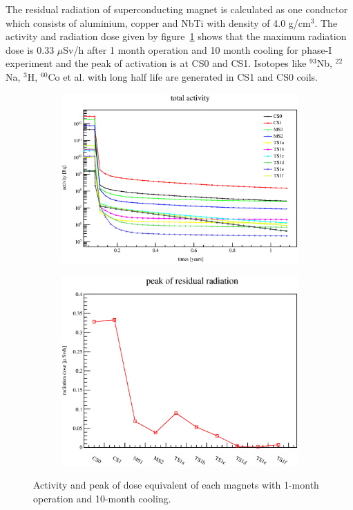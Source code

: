 The residual radiation of superconducting magnet is calculated as one conductor which consists of aluminium, copper and NbTi with density of 4.0 g/cm$^3$.
The activity and radiation dose given by figure~\ref{2dose} shows that the maximum radiation dose is 0.33 $\mu$Sv/h after 1 month operation and 10 month cooling for phase-I experiment and the peak of activation is at CS0 and CS1.
Isotopes like $^{93}$Nb, $^{22}$Na, $^3$H, $^{60}$Co et al. with long half life are generated in CS1 and CS0 coils.
 \begin{figure}[H]
  \begin{subfigure}{0.3\textwidth}
   \centering
   \includegraphics[scale=0.45]{chapter3/fig/activity.eps}
  \end{subfigure}
  \hspace{0.2\textwidth}
  \begin{subfigure}{0.3\textwidth}
   \centering
   \includegraphics[scale=0.40]{chapter3/fig/dose.eps}
  \end{subfigure}
  \caption{Activity and peak of dose equivalent of each magnets with 1-month operation and 10-month cooling.}
  \label{2dose}
 \end{figure}

